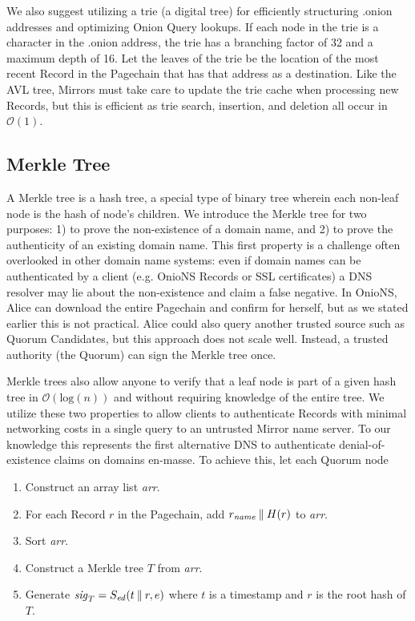 We also suggest utilizing a trie (a digital tree) for efficiently structuring .onion addresses and optimizing Onion Query lookups. If each node in the trie is a character in the .onion address, the trie has a branching factor of 32 and a maximum depth of 16. Let the leaves of the trie be the location of the most recent Record in the Pagechain that has that address as a destination. Like the AVL tree, Mirrors must take care to update the trie cache when processing new Records, but this is efficient as trie search, insertion, and deletion all occur in $ \mathcal{O}(1) $.

\subsection{Merkle Tree}
\label{sec:MerkleTree}

A Merkle tree is a hash tree, a special type of binary tree wherein each non-leaf node is the hash of node's children. We introduce the Merkle tree for two purposes: 1) to prove the non-existence of a domain name, and 2) to prove the authenticity of an existing domain name. This first property is a challenge often overlooked in other domain name systems: even if domain names can be authenticated by a client (e.g. OnioNS Records or SSL certificates) a DNS resolver may lie about the non-existence and claim a false negative. In OnioNS, Alice can download the entire Pagechain and confirm for herself, but as we stated earlier this is not practical. Alice could also query another trusted source such as Quorum Candidates, but this approach does not scale well. Instead, a trusted authority (the Quorum) can sign the Merkle tree once.

Merkle trees also allow anyone to verify that a leaf node is part of a given hash tree in $ \mathcal{O}(\mathrm{log}(n)) $ and without requiring knowledge of the entire tree. We utilize these two properties to allow clients to authenticate Records with minimal networking costs in a single query to an untrusted Mirror name server. To our knowledge this represents the first alternative DNS to authenticate denial-of-existence claims on domains en-masse. To achieve this, let each Quorum node

\begin{enumerate}
	\item Construct an array list \emph{arr}.
	\item For each Record $ r $ in the Pagechain, add $ r_{\mathit{name}} \mathbin{\|} H(r) $ to \emph{arr}.
	\item Sort \emph{arr}.
	\item Construct a Merkle tree $ T $ from \emph{arr}.
	\item Generate $ \mathit{sig}_{T} = S_{\mathit{ed}}(t \mathbin{\|} r, e) $ where $ t $ is a timestamp and $ r $ is the root hash of $ T $.
\end{enumerate}

